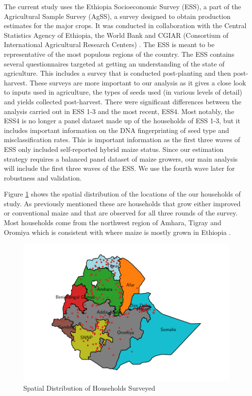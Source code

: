 \documentclass{article}
\begin{document}
The current study uses the Ethiopia Socioeconomic Survey (ESS), a part of the Agricultural Sample Survey (AgSS), a survey 
designed to obtain production estimates for the major crops. It was conducted in collaboration with the Central Statistics Agency of Ethiopia, the World Bank and CGIAR (Consortium of International Agricultural Research Centers) \citep{kosmowski2020shining}. The ESS is meant to be representative of the most populous regions of the country. The ESS contains several questionnaires targeted at getting an understanding of the state of agriculture. This includes a survey that is conducted post-planting and then post-harvest. These surveys are more important to our analysis as it gives a close look to inputs used in agriculture, the types of seeds used (in various levels of detail) and yields collected post-harvest. There were significant differences between the analysis carried out in ESS 1-3 and the most recent, ESS4. Most notably, the ESS4 is no longer a panel dataset made up of the households of ESS 1-3, but it includes important information on the DNA fingerprinting of seed type and misclassification rates. This is important information as the first three waves of ESS only included self-reported hybrid maize status. Since our estimation strategy requires a balanced panel dataset of maize growers, our main analysis will include the first three waves of the ESS. We use the fourth wave later for robustness and validation.

Figure \ref{map:regions} shows the spatial distribution of the locations of the our households of study. As previously mentioned these are households that grow either improved or conventional maize and that are observed for all three rounds of the survey. Most households come from the northwest region of Amhara, Tigray and Oromiya which is consistent with where maize is mostly grown in Ethiopia \citep{Abate2015-rj}.

\begin{figure}
    \centering
    \includegraphics{results/figures/map_hhids.pdf}
    \caption{Spatial Distribution of Households Surveyed}
    \label{map:regions}
\end{figure}
\end{document}
